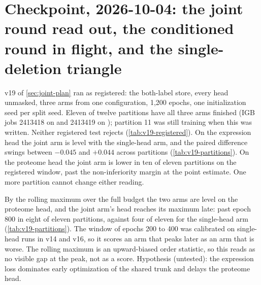 
\section{Checkpoint, 2026-10-04: the joint round read out, the conditioned round in flight, and the single-deletion triangle}
\label{sec:checkpoint}

 v19 of \cref{sec:joint-plan} ran as
registered: the both-label store, every head unmasked, three arms from one configuration,
1,200 epochs, one initialization seed per split seed. Eleven of twelve partitions have all
three arms finished (IGB jobs 2413418 on  and 2413419 on ); partition
11 was still training when this was written. Neither registered test rejects
(\cref{tab:v19-registered}). On the expression head the joint arm is level with the
single-head arm, and the paired difference swings between $-0.045$ and $+0.044$ across
partitions (\cref{tab:v19-partitions}). On the proteome head the joint arm is lower in ten of
eleven partitions on the registered window, past the non-inferiority margin at the point
estimate. One more partition cannot change either reading.





 By the rolling maximum over the full
budget the two arms are level on the proteome head, and the joint arm's head reaches its
maximum late: past epoch 800 in eight of eleven partitions, against four of eleven for the
single-head arm (\cref{tab:v19-partitions}). The window of epochs 200 to 400 was calibrated
on single-head runs in v14 and v16, so it scores an arm that peaks later as an arm that is
worse. The rolling maximum is an upward-biased order statistic, so this reads as no visible
gap at the peak, not as a score. Hypothesis (untested): the expression loss dominates early
optimization of the shared trunk and delays the proteome head.

